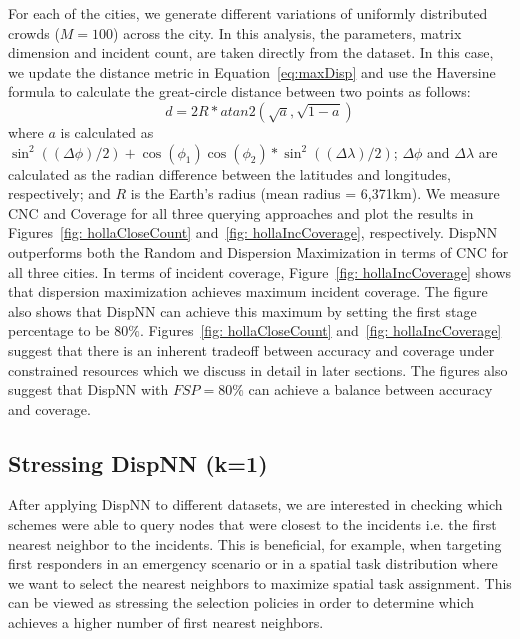 \documentclass{acm_proc_article-sp}
\begin{document}
For each of the cities, we generate different variations of uniformly distributed crowds ($M = 100$) across the city. In this analysis, the parameters, matrix dimension and incident count, are taken directly from the dataset. In this case, we update the distance metric in Equation~\ref{eq:maxDisp} and use the Haversine formula to calculate the great-circle distance between two points as follows:
\begin{equation} \label{eq:maxDisp2}
d = 2R*atan2(\sqrt{a}, \sqrt{1-a})
\end{equation}
where $a$ is calculated as $ \sin ^2((\Delta \phi)/2 ) + \cos(\phi_1)\cos(\phi_2) * \sin ^2((\Delta \lambda)/2 )$; $\Delta \phi$ and $\Delta \lambda$ are calculated as the radian difference between the latitudes and longitudes, respectively; and $R$ is the Earth's radius (mean radius = 6,371km). We measure CNC and Coverage for all three querying approaches and plot the results in Figures~\ref{fig: hollaCloseCount} and~\ref{fig: hollaIncCoverage}, respectively. DispNN outperforms both the Random and Dispersion Maximization in terms of CNC for all three cities. In terms of incident coverage, Figure~\ref{fig: hollaIncCoverage} shows that dispersion maximization achieves maximum incident coverage. The figure also shows that DispNN can achieve this maximum by setting the first stage percentage to be $80\%$. Figures~\ref{fig: hollaCloseCount} and~\ref{fig: hollaIncCoverage} suggest that there is an inherent tradeoff between accuracy and coverage under constrained resources which we discuss in detail in later sections. The figures also suggest that DispNN with $FSP = 80\%$ can achieve a balance between accuracy and coverage.\par

\subsection{Stressing DispNN (k=1)}
After applying DispNN to different datasets, we are interested in checking which schemes were able to query nodes that were closest to the incidents i.e. the first nearest neighbor to the incidents. This is beneficial, for example, when targeting first responders in an emergency scenario or in a spatial task distribution where we want to select the nearest neighbors to maximize spatial task assignment. This can be viewed as stressing the selection policies in order to determine which achieves a higher number of first nearest neighbors.\par
\end{document}
